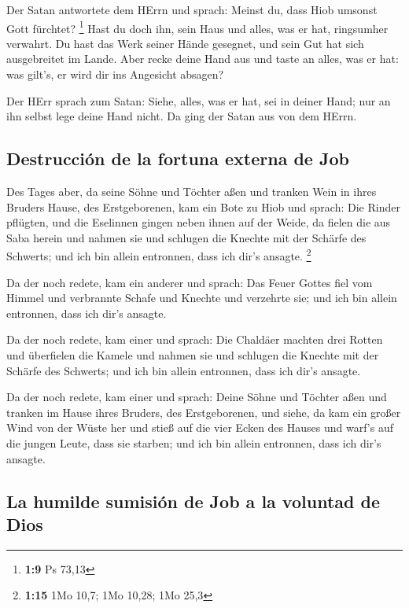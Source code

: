  Der Satan antwortete dem HErrn und sprach: Meinst du,
dass Hiob umsonst Gott fürchtet? \footnote{\textbf{1:9} Ps 73,13}
 Hast du doch ihn, sein Haus und alles, was er hat,
ringsumher verwahrt. Du hast das Werk seiner Hände gesegnet, und sein
Gut hat sich ausgebreitet im Lande.  Aber recke deine
Hand aus und taste an alles, was er hat: was gilt's, er wird dir ins
Angesicht absagen?

 Der HErr sprach zum Satan: Siehe, alles, was er hat, sei
in deiner Hand; nur an ihn selbst lege deine Hand nicht. Da ging der
Satan aus von dem HErrn.

\hypertarget{destrucciuxf3n-de-la-fortuna-externa-de-job}{%
\subsection{Destrucción de la fortuna externa de
Job}\label{destrucciuxf3n-de-la-fortuna-externa-de-job}}

 Des Tages aber, da seine Söhne und Töchter aßen und
tranken Wein in ihres Bruders Hause, des Erstgeborenen, 
kam ein Bote zu Hiob und sprach: Die Rinder pflügten, und die Eselinnen
gingen neben ihnen auf der Weide,  da fielen die aus Saba
herein und nahmen sie und schlugen die Knechte mit der Schärfe des
Schwerts; und ich bin allein entronnen, dass ich dir's ansagte.
\footnote{\textbf{1:15} 1Mo 10,7; 1Mo 10,28; 1Mo 25,3}

 Da der noch redete, kam ein anderer und sprach: Das
Feuer Gottes fiel vom Himmel und verbrannte Schafe und Knechte und
verzehrte sie; und ich bin allein entronnen, dass ich dir's ansagte.

 Da der noch redete, kam einer und sprach: Die Chaldäer
machten drei Rotten und überfielen die Kamele und nahmen sie und
schlugen die Knechte mit der Schärfe des Schwerts; und ich bin allein
entronnen, dass ich dir's ansagte.

 Da der noch redete, kam einer und sprach: Deine Söhne
und Töchter aßen und tranken im Hause ihres Bruders, des Erstgeborenen,
 und siehe, da kam ein großer Wind von der Wüste her und
stieß auf die vier Ecken des Hauses und warf's auf die jungen Leute,
dass sie starben; und ich bin allein entronnen, dass ich dir's ansagte.

\hypertarget{la-humilde-sumisiuxf3n-de-job-a-la-voluntad-de-dios}{%
\subsection{La humilde sumisión de Job a la voluntad de
Dios}\label{la-humilde-sumisiuxf3n-de-job-a-la-voluntad-de-dios}}

